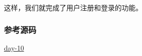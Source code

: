 这样，我们就完成了用户注册和登录的功能。

\hypertarget{ux53c2ux8003ux6e90ux7801}{%
\subsubsection{参考源码}\label{ux53c2ux8003ux6e90ux7801}}

\href{https://github.com/michaelliao/awesome-python3-webapp/tree/day-10}{day-10}

